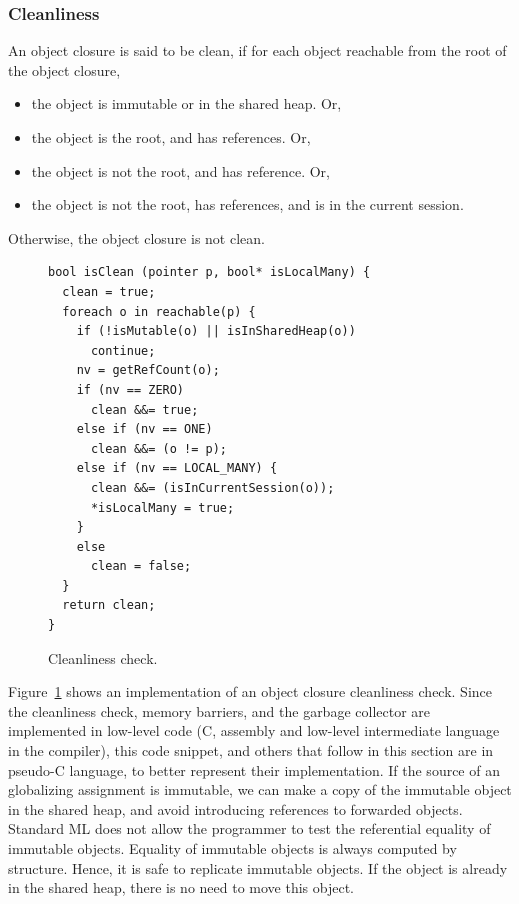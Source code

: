\subsubsection{Cleanliness}

An object closure is said to be clean, if for each object reachable from the
root of the object closure,

\begin{itemize}
\item the object is immutable or in the shared heap. Or,
\item the object is the root, and has  references. Or,
\item the object is not the root, and has  reference. Or,
\item the object is not the root, has  references, and is in the
current session.
\end{itemize}

\noindent Otherwise, the object closure is not clean.

\begin{figure}[t]
\begin{lstlisting}
bool isClean (pointer p, bool* isLocalMany) {
  clean = true;
  foreach o in reachable(p) {
    if (!isMutable(o) || isInSharedHeap(o))
      continue;
    nv = getRefCount(o);
    if (nv == ZERO)
      clean &&= true;
    else if (nv == ONE)
      clean &&= (o != p);
    else if (nv == LOCAL_MANY) {
      clean &&= (isInCurrentSession(o));
      *isLocalMany = true;
    }
    else
      clean = false;
  }
  return clean;
}
\end{lstlisting}
\caption{Cleanliness check.}
\label{code:cleanliness}
\end{figure}

Figure~\ref{code:cleanliness} shows an implementation of an object closure
cleanliness check. Since the cleanliness check, memory barriers, and the
garbage collector are implemented in low-level code (C, assembly and low-level
intermediate language in the compiler), this code snippet, and others that
follow in this section are in pseudo-C language, to better represent their
implementation. If the source of an globalizing assignment is immutable, we can
make a copy of the immutable object in the shared heap, and avoid introducing
references to forwarded objects. Standard ML does not allow the programmer to
test the referential equality of immutable objects. Equality of immutable
objects is always computed by structure. Hence, it is safe to replicate
immutable objects. If the object is already in the shared heap, there is no
need to move this object.


